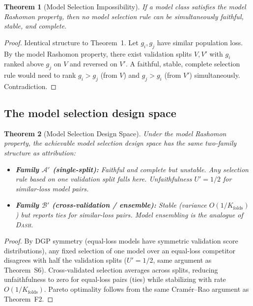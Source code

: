 \documentclass{article}
\newcommand{\DASH}{\textsc{Dash}}
\newtheorem{theorem}{Theorem}
\begin{document}
\begin{theorem}[Model Selection Impossibility]
\label{thm:model-selection}
If a model class satisfies the model Rashomon property, then no
model selection rule can be simultaneously faithful, stable, and
complete.
\end{theorem}

\begin{proof}
Identical structure to Theorem~1. Let $g_i, g_j$ have similar
population loss. By the model Rashomon property, there exist
validation splits $V, V'$ with $g_i$ ranked above $g_j$ on $V$
and reversed on $V'$. A faithful, stable, complete selection rule
would need to rank $g_i > g_j$ (from $V$) and $g_j > g_i$ (from
$V'$) simultaneously. Contradiction.
\end{proof}

\subsection{The model selection design space}

\begin{theorem}[Model Selection Design Space]
\label{thm:model-selection-ds}
Under the model Rashomon property, the achievable model selection
design space has the same two-family structure as attribution:
\begin{itemize}
    \item \textbf{Family $\mathcal{A}'$ (single-split):} Faithful
      and complete but unstable. Any selection rule based on one
      validation split falls here. Unfaithfulness $U' = 1/2$ for
      similar-loss model pairs.
    \item \textbf{Family $\mathcal{B}'$ (cross-validation / ensemble):}
      Stable (variance $O(1/K_{\text{folds}})$) but reports ties for
      similar-loss pairs. Model ensembling is the analogue of \DASH{}.
\end{itemize}
\end{theorem}

\begin{proof}
By DGP symmetry (equal-loss models have symmetric validation score
distributions), any fixed selection of one model over an equal-loss
competitor disagrees with half the validation splits
($U' = 1/2$, same argument as Theorem~S6).
Cross-validated selection averages across splits, reducing
unfaithfulness to zero for equal-loss pairs (ties) while stabilizing
with rate $O(1/K_{\text{folds}})$.
Pareto optimality follows from the same Cram\'er--Rao argument as
Theorem~F2.
\end{proof}
\end{document}
